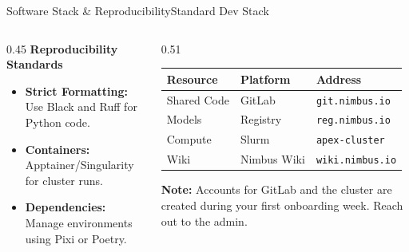 \begin{frame}{Software Stack \& Reproducibility}{Standard Dev Stack}
  \begin{columns}[T]
    \begin{column}{0.45\textwidth}
      \textbf{Reproducibility Standards}
      \begin{itemize}
        \item \textbf{Strict Formatting:} Use Black and Ruff for Python code.
        \item \textbf{Containers:} Apptainer/Singularity for cluster runs.
        \item \textbf{Dependencies:} Manage environments using Pixi or Poetry.
      \end{itemize}
    \end{column}
    
    \begin{column}{0.51\textwidth}
      \centering
      \scriptsize
      \begin{tabular}{lll}
        \toprule
        \textbf{Resource} & \textbf{Platform} & \textbf{Address} \\
        \midrule
        Shared Code & GitLab & \texttt{git.nimbus.io} \\
        Models & Registry & \texttt{reg.nimbus.io} \\
        Compute & Slurm & \texttt{apex-cluster} \\
        Wiki & Nimbus Wiki & \texttt{wiki.nimbus.io} \\
        \bottomrule
      \end{tabular}
      
      \vspace{0.4cm}
      \begin{accentbox}
        \scriptsize
        \textbf{Note:} Accounts for GitLab and the cluster are created during your first onboarding week. Reach out to the admin.
      \end{accentbox}
    \end{column}
  \end{columns}
\end{frame}
